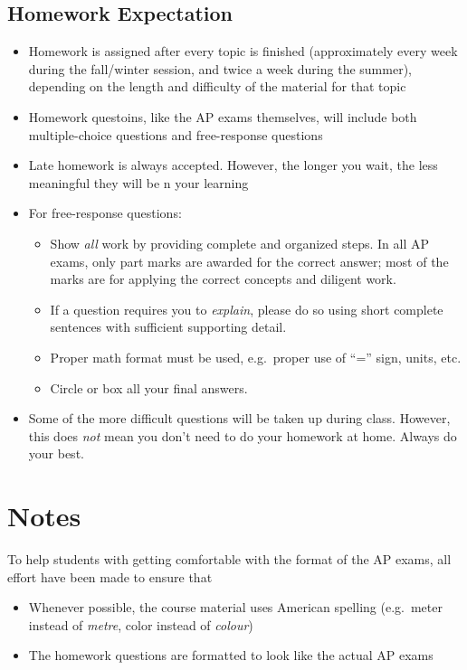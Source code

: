 \documentclass{../../oss-handout}
\begin{document}
\subsection{Homework Expectation}
\begin{itemize}[noitemsep,topsep=0pt,leftmargin=18pt]
\item Homework is assigned after every topic is finished (approximately every
  week during the fall/winter session, and twice a week during the summer),
  depending on the length and difficulty of the material for that topic
\item Homework questoins, like the AP exams themselves, will include both
  multiple-choice questions and free-response questions
\item Late homework is always accepted. However, the longer you wait, the less
  meaningful they will be n your learning
  \newpage
\item For free-response questions:
  \begin{itemize}[noitemsep,topsep=0pt,leftmargin=15pt]
  \item Show \emph{all} work by providing complete and organized steps. In all
    AP exams, only part marks are awarded for the correct answer; most of the
    marks are for applying the correct concepts and diligent work.
  \item If a question requires you to \emph{explain}, please do so using
    short complete sentences with sufficient supporting detail.
  \item Proper math format must be used, e.g.\ proper use of ``='' sign, units,
    etc.
  \item Circle or box all your final answers.
  \end{itemize}
\item Some of the more difficult questions will be taken up during class.
  However, this does \emph{not} mean you don't need to do your homework at
  home. Always do your best.
\end{itemize}


\section*{Notes}
To help students with getting comfortable with the format of the AP exams, all
effort have been made to ensure that
\begin{itemize}[noitemsep,topsep=0pt,leftmargin=15pt]
\item Whenever possible, the course material uses American spelling (e.g.\
  meter instead of \emph{metre}, color instead of \emph{colour})
\item The homework questions are formatted to look like the actual AP exams
\end{itemize}
\end{document}
